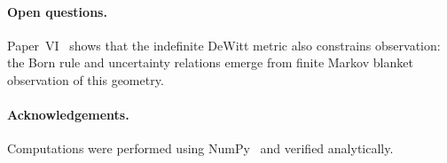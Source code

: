 \documentclass[12pt,a4paper]{article}
\theoremstyle{definition}
\begin{document}
\paragraph{Open questions.}
Paper~VI~\cite{Paper6} shows that the indefinite DeWitt metric also constrains observation: the Born rule and uncertainty relations emerge from finite Markov blanket observation of this geometry.

\paragraph{Acknowledgements.}
Computations were performed using NumPy~\cite{numpy} and verified analytically.




\end{document}
